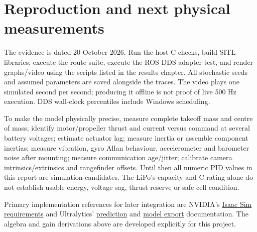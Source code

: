 \chapter{Reproduction and next physical measurements}
The evidence is dated 20 October 2026. Run the host C checks, build SITL
libraries, execute the route suite, execute the ROS DDS adapter test, and render
graphs/video using the scripts listed in the results chapter. All stochastic
seeds and assumed parameters are saved alongside the traces. The video plays
one simulated second per second; producing it offline is not proof of live
500 Hz execution. DDS wall-clock percentiles include Windows scheduling.

To make the model physically precise, measure complete takeoff mass and
centre of mass; identify motor/propeller thrust and current versus command at
several battery voltages; estimate actuator lag; measure inertia or assemble
component inertias; measure vibration, gyro Allan behaviour, accelerometer
and barometer noise after mounting; measure communication age/jitter; calibrate
camera intrinsics/extrinsics and rangefinder offsets. Until then all numeric
PID values in this report are simulation candidates. The LiPo's capacity and
C-rating alone do not establish usable energy, voltage sag, thrust reserve or
safe cell condition.

Primary implementation references for later integration are NVIDIA's
\href{https://docs.isaacsim.omniverse.nvidia.com/6.0.1/installation/requirements.html}{Isaac Sim requirements}
and Ultralytics' \href{https://docs.ultralytics.com/modes/predict/}{prediction}
and \href{https://docs.ultralytics.com/modes/export/}{model export} documentation.
The algebra and gain derivations above are developed explicitly for this project.
